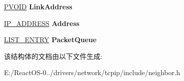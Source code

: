 \begin{DoxyCompactItemize}
\item 
\mbox{\label{struct_n_e_i_g_h_b_o_r___c_a_c_h_e___e_n_t_r_y_a5d6779ce1c35c9f1a47702af3d0e1c32}} 
\hyperlink{interfacevoid}{P\+V\+O\+ID} {\bfseries Link\+Address}
\item 
\mbox{\label{struct_n_e_i_g_h_b_o_r___c_a_c_h_e___e_n_t_r_y_a4e61ef037e229d37ad8f2dfc75004e4f}} 
\hyperlink{struct_i_p___a_d_d_r_e_s_s}{I\+P\+\_\+\+A\+D\+D\+R\+E\+SS} {\bfseries Address}
\item 
\mbox{\label{struct_n_e_i_g_h_b_o_r___c_a_c_h_e___e_n_t_r_y_ae4e286e5c7f9d831cdd3ec2ab5a7878f}} 
\hyperlink{struct___l_i_s_t___e_n_t_r_y}{L\+I\+S\+T\+\_\+\+E\+N\+T\+RY} {\bfseries Packet\+Queue}
\end{DoxyCompactItemize}


该结构体的文档由以下文件生成\+:\begin{DoxyCompactItemize}
\item 
E\+:/\+React\+O\+S-\/0../drivers/network/tcpip/include/neighbor.\+h\end{DoxyCompactItemize}
